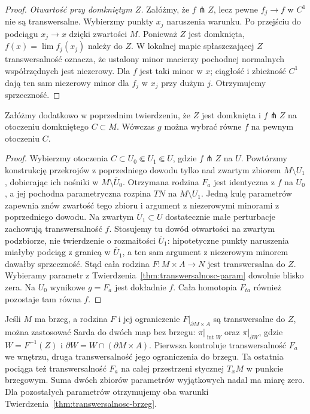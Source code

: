 \begin{proof}
\emph{Otwartość przy domkniętym $Z$.}
Załóżmy, że $f\pitchfork Z$, lecz pewne
$f_j\to f$ w $C^1$ nie są transwersalne.
Wybierzmy punkty $x_j$ naruszenia warunku.
Po przejściu do podciągu $x_j\to x$ dzięki
zwartości $M$. Ponieważ $Z$ jest domknięta,
$f(x)=\lim f_j(x_j)$ należy do $Z$.
W lokalnej mapie spłaszczającej $Z$
transwersalność oznacza, że ustalony
minor macierzy pochodnej normalnych
współrzędnych jest niezerowy. Dla $f$
jest taki minor w $x$; ciągłość i zbieżność
$C^1$ dają ten sam niezerowy minor dla
$f_j$ w $x_j$ przy dużym $j$.
Otrzymujemy sprzeczność.
\end{proof}

\begin{wniosek}
\label{cor:transwersalnosc-wzgledna}
Załóżmy dodatkowo w poprzednim twierdzeniu,
że $Z$ jest domknięta i $f\pitchfork Z$
na otoczeniu domkniętego $C\subset M$.
Wówczas $g$ można wybrać równe $f$
na pewnym otoczeniu $C$.
\end{wniosek}
\begin{proof}
Wybierzmy otoczenia
$C\subset U_0\Subset U_1\Subset U$,
gdzie $f\pitchfork Z$ na $U$.
Powtórzmy konstrukcję przekrojów z poprzedniego
dowodu tylko nad zwartym zbiorem
$M\setminus U_1$, dobierając ich nośniki
w $M\setminus\overline U_0$.
Otrzymana rodzina $F_a$ jest identyczna z
$f$ na $U_0$, a jej pochodna parametryczna
rozpina $TN$ na $M\setminus U_1$.
Jedną kulę parametrów zapewnia znów zwartość tego zbioru
i argument z niezerowymi minorami z poprzedniego dowodu.
Na zwartym $\overline U_1\subset U$ dostatecznie małe
perturbacje zachowują transwersalność $f$. Stosujemy
tu dowód otwartości na zwartym podzbiorze, nie twierdzenie
o rozmaitości $\overline U_1$: hipotetyczne punkty
naruszenia miałyby podciąg z granicą w $\overline U_1$,
a ten sam argument z niezerowym minorem dawałby sprzeczność.
Stąd cała rodzina $F:M\times A\to N$
jest transwersalna do $Z$.
Wybieramy parametr z
Twierdzenia~\ref{thm:transwersalnosc-param}
dowolnie blisko zera. Na $U_0$ wynikowe
$g=F_a$ jest dokładnie $f$. Cała homotopia $F_{ta}$
również pozostaje tam równa $f$.
\end{proof}

Jeśli $M$ ma brzeg, a rodzina $F$ i jej
ograniczenie $F|_{\partial M\times A}$
są transwersalne do $Z$, można zastosować
Sarda do dwóch map bez brzegu:
$\pi|_{\operatorname{int}W}$ oraz $\pi|_{\partial W}$,
gdzie $W=F^{-1}(Z)$ i $\partial W=W\cap(\partial M\times A)$.
Pierwsza kontroluje transwersalność $F_a$ we wnętrzu,
druga transwersalność jego ograniczenia do brzegu.
Ta ostatnia pociąga też transwersalność $F_a$ na całej
przestrzeni stycznej $T_xM$ w punkcie brzegowym.
Suma dwóch zbiorów parametrów wyjątkowych
nadal ma miarę zero. Dla pozostałych
parametrów otrzymujemy oba warunki
Twierdzenia~\ref{thm:transwersalnosc-brzeg}.


